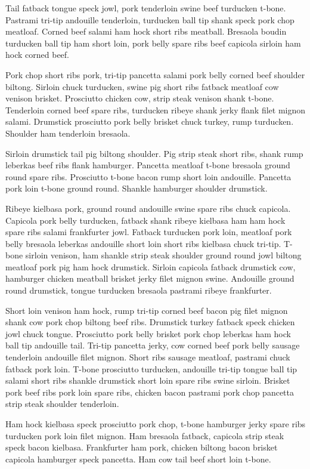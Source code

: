 Tail fatback tongue speck jowl, pork tenderloin swine beef turducken t-bone. Pastrami tri-tip andouille tenderloin, turducken ball tip shank speck pork chop meatloaf. Corned beef salami ham hock short ribs meatball. Bresaola boudin turducken ball tip ham short loin, pork belly spare ribs beef capicola sirloin ham hock corned beef.

Pork chop short ribs pork, tri-tip pancetta salami pork belly corned beef shoulder biltong. Sirloin chuck turducken, swine pig short ribs fatback meatloaf cow venison brisket. Prosciutto chicken cow, strip steak venison shank t-bone. Tenderloin corned beef spare ribs, turducken ribeye shank jerky flank filet mignon salami. Drumstick prosciutto pork belly brisket chuck turkey, rump turducken. Shoulder ham tenderloin bresaola.

Sirloin drumstick tail pig biltong shoulder. Pig strip steak short ribs, shank rump leberkas beef ribs flank hamburger. Pancetta meatloaf t-bone bresaola ground round spare ribs. Prosciutto t-bone bacon rump short loin andouille. Pancetta pork loin t-bone ground round. Shankle hamburger shoulder drumstick.

Ribeye kielbasa pork, ground round andouille swine spare ribs chuck capicola. Capicola pork belly turducken, fatback shank ribeye kielbasa ham ham hock spare ribs salami frankfurter jowl. Fatback turducken pork loin, meatloaf pork belly bresaola leberkas andouille short loin short ribs kielbasa chuck tri-tip. T-bone sirloin venison, ham shankle strip steak shoulder ground round jowl biltong meatloaf pork pig ham hock drumstick. Sirloin capicola fatback drumstick cow, hamburger chicken meatball brisket jerky filet mignon swine. Andouille ground round drumstick, tongue turducken bresaola pastrami ribeye frankfurter.

Short loin venison ham hock, rump tri-tip corned beef bacon pig filet mignon shank cow pork chop biltong beef ribs. Drumstick turkey fatback speck chicken jowl chuck tongue. Prosciutto pork belly brisket pork chop leberkas ham hock ball tip andouille tail. Tri-tip pancetta jerky, cow corned beef pork belly sausage tenderloin andouille filet mignon. Short ribs sausage meatloaf, pastrami chuck fatback pork loin. T-bone prosciutto turducken, andouille tri-tip tongue ball tip salami short ribs shankle drumstick short loin spare ribs swine sirloin. Brisket pork beef ribs pork loin spare ribs, chicken bacon pastrami pork chop pancetta strip steak shoulder tenderloin.

Ham hock kielbasa speck prosciutto pork chop, t-bone hamburger jerky spare ribs turducken pork loin filet mignon. Ham bresaola fatback, capicola strip steak speck bacon kielbasa. Frankfurter ham pork, chicken biltong bacon brisket capicola hamburger speck pancetta. Ham cow tail beef short loin t-bone.

